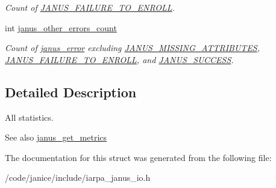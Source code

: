 \begin{DoxyCompactItemize}
\begin{DoxyCompactList}\small\item\em Count of \hyperlink{group__janus_gga1b275e4dade484951b366f785597b8f6aed03c0e4fc7eb92d37277769beb3b884}{J\+A\+N\+U\+S\+\_\+\+F\+A\+I\+L\+U\+R\+E\+\_\+\+T\+O\+\_\+\+E\+N\+R\+O\+L\+L}. \end{DoxyCompactList}\item 
\hypertarget{structjanus__metrics_af15135c320545daa8744283d255eaa44}{}int \hyperlink{structjanus__metrics_af15135c320545daa8744283d255eaa44}{janus\+\_\+other\+\_\+errors\+\_\+count}\label{structjanus__metrics_af15135c320545daa8744283d255eaa44}

\begin{DoxyCompactList}\small\item\em Count of \hyperlink{group__janus_ga8d1da4647fdb996401e33bc8c40ea773}{janus\+\_\+error} excluding \hyperlink{group__janus_gga1b275e4dade484951b366f785597b8f6aa4c0854ce7d2d0c12ec33af8a37a55fd}{J\+A\+N\+U\+S\+\_\+\+M\+I\+S\+S\+I\+N\+G\+\_\+\+A\+T\+T\+R\+I\+B\+U\+T\+E\+S}, \hyperlink{group__janus_gga1b275e4dade484951b366f785597b8f6aed03c0e4fc7eb92d37277769beb3b884}{J\+A\+N\+U\+S\+\_\+\+F\+A\+I\+L\+U\+R\+E\+\_\+\+T\+O\+\_\+\+E\+N\+R\+O\+L\+L}, and \hyperlink{group__janus_gga1b275e4dade484951b366f785597b8f6ab0b46979b869e754aba5c82530126aee}{J\+A\+N\+U\+S\+\_\+\+S\+U\+C\+C\+E\+S\+S}. \end{DoxyCompactList}\end{DoxyCompactItemize}


\subsection{Detailed Description}
All statistics. 

\begin{DoxySeeAlso}{See also}
\hyperlink{group__janus__io_gace8f8eb72e7f7bcb23ff0a6e0452a4be}{janus\+\_\+get\+\_\+metrics} 
\end{DoxySeeAlso}


The documentation for this struct was generated from the following file\+:\begin{DoxyCompactItemize}
\item 
/code/janice/include/iarpa\+\_\+janus\+\_\+io.\+h\end{DoxyCompactItemize}
